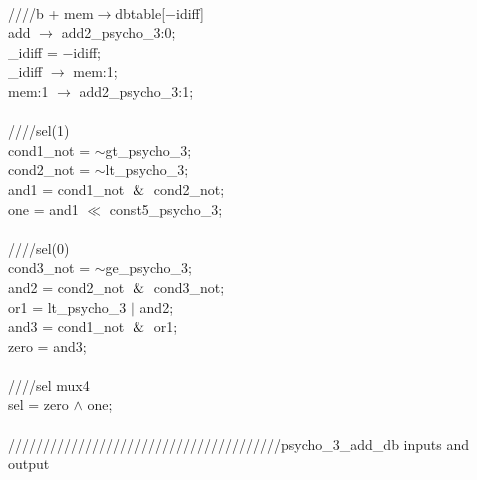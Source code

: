 {   \\
   \hspace*{2em}////b + mem$\rightarrow$dbtable[$-$idiff] \\
   \hspace*{2em}add $\rightarrow$ add2\_psycho\_3:0; \\
   \hspace*{2em}\_idiff = $-$idiff; \\
   \hspace*{2em}\_idiff $\rightarrow$ mem:1; \\
   \hspace*{2em}mem:1 $\rightarrow$ add2\_psycho\_3:1; \\
   \\
   \hspace*{2em}////sel(1) \\
   \hspace*{2em}cond1\_not = $\sim$gt\_psycho\_3; \\
   \hspace*{2em}cond2\_not = $\sim$lt\_psycho\_3; \\
   \hspace*{2em}and1 = cond1\_not $\And$ cond2\_not; \\
   \hspace*{2em}one = and1 $\ll$ const5\_psycho\_3; \\
   \\
   \hspace*{2em}////sel(0) \\
   \hspace*{2em}cond3\_not = $\sim$ge\_psycho\_3; \\
   \hspace*{2em}and2 = cond2\_not $\And$ cond3\_not; \\
   \hspace*{2em}or1 = lt\_psycho\_3 $\vert$ and2; \\
   \hspace*{2em}and3 = cond1\_not $\And$ or1; \\
   \hspace*{2em}zero = and3; \\
   \\
   \hspace*{2em}////sel mux4 \\
   \hspace*{2em}sel = zero $\wedge$ one; \\
   \\
   \hspace*{2em}///////////////////////////////////////psycho\_3\_add\_db inputs and output \\
}
